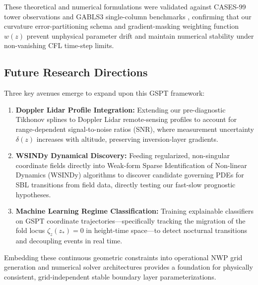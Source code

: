 These theoretical and numerical formulations were validated against CASES-99 tower observations and GABLS3 single-column benchmarks \cite{cases99, gabls3_2013}, confirming that our curvature error-partitioning schema and gradient-masking weighting function $w(z)$ prevent unphysical parameter drift and maintain numerical stability under non-vanishing CFL time-step limits.

\subsection{Future Research Directions}

Three key avenues emerge to expand upon this GSPT framework:
\begin{enumerate}
    \item \textbf{Doppler Lidar Profile Integration:} Extending our pre-diagnostic Tikhonov splines to Doppler Lidar remote-sensing profiles to account for range-dependent signal-to-noise ratios (SNR), where measurement uncertainty $\delta(z)$ increases with altitude, preserving inversion-layer gradients.
    \item \textbf{WSINDy Dynamical Discovery:} Feeding regularized, non-singular coordinate fields directly into Weak-form Sparse Identification of Non-linear Dynamics (WSINDy) algorithms to discover candidate governing PDEs for SBL transitions from field data, directly testing our fast-slow prognostic hypotheses.
    \item \textbf{Machine Learning Regime Classification:} Training explainable classifiers on GSPT coordinate trajectories—specifically tracking the migration of the fold locus $\zeta_z(z_*) = 0$ in height-time space—to detect nocturnal transitions and decoupling events in real time.
\end{enumerate}

Embedding these continuous geometric constraints into operational NWP grid generation and numerical solver architectures provides a foundation for physically consistent, grid-independent stable boundary layer parameterizations.